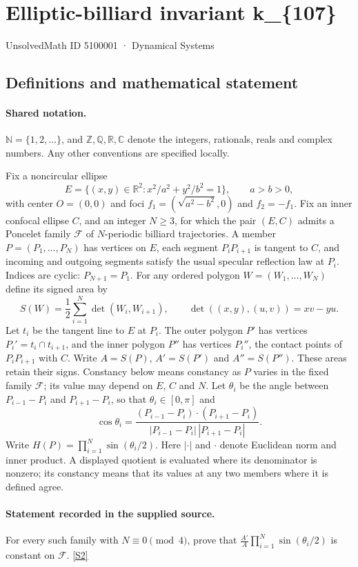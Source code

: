 \documentclass[11pt]{article}
\newcommand{\sref}[2]{\hyperlink{source:#1:#2}{[S#2]}}
\begin{document}
\setcounter{section}{5100000}
\section{Elliptic-billiard invariant k\_\{107\}}\label{5100001}
{\small\sffamily UnsolvedMath ID 5100001 · Dynamical Systems}
\subsection{Definitions and mathematical statement}

\paragraph{Shared notation.}$\mathbb N=\{1,2,\ldots\}$, and $\mathbb Z,\mathbb Q,\mathbb R,\mathbb C$ denote the integers, rationals, reals and complex numbers. Any other conventions are specified locally.


Fix a noncircular ellipse
\[
E=\{(x,y)\in\mathbb R^2:x^2/a^2+y^2/b^2=1\},\qquad a>b>0,
\]
with center $O=(0,0)$ and foci $f_1=(\sqrt{a^2-b^2},0)$ and $f_2=-f_1$. Fix an inner confocal ellipse $C$, and an integer $N\geq3$, for which the pair $(E,C)$ admits a Poncelet family $\mathcal F$ of $N$-periodic billiard trajectories. A member $P=(P_1,\ldots,P_N)$ has vertices on $E$, each segment $P_iP_{i+1}$ is tangent to $C$, and incoming and outgoing segments satisfy the usual specular reflection law at $P_i$. Indices are cyclic: $P_{N+1}=P_1$.
For any ordered polygon $W=(W_1,\ldots,W_N)$ define its signed area by
\[
S(W)=\frac12\sum_{i=1}^N\det(W_i,W_{i+1}),\qquad
\det((x,y),(u,v))=xv-yu.
\]
Let $t_i$ be the tangent line to $E$ at $P_i$. The outer polygon $P'$ has vertices $P_i'=t_i\cap t_{i+1}$, and the inner polygon $P''$ has vertices $P_i''$, the contact points of $P_iP_{i+1}$ with $C$. Write $A=S(P)$, $A'=S(P')$ and $A''=S(P'')$. These areas retain their signs. Constancy below means constancy as $P$ varies in the fixed family $\mathcal F$; its value may depend on $E$, $C$ and $N$.
Let $\theta_i$ be the angle between $P_{i-1}-P_i$ and $P_{i+1}-P_i$, so that $\theta_i\in[0,\pi]$ and
\[
\cos\theta_i=\frac{(P_{i-1}-P_i)\cdot(P_{i+1}-P_i)}{|P_{i-1}-P_i|\,|P_{i+1}-P_i|}.
\]
Write $H(P)=\prod_{i=1}^N\sin(\theta_i/2)$. Here $|\cdot|$ and $\cdot$ denote Euclidean norm and inner product.
A displayed quotient is evaluated where its denominator is nonzero; its constancy means that its values at any two members where it is defined agree.
\paragraph{Statement recorded in the supplied source.}
For every such family with $N\equiv0\pmod4$, prove that $\displaystyle \frac{A'}{A}\prod_{i=1}^N\sin(\theta_i/2)$ is constant on $\mathcal F$. \sref{5100001}{2}
\end{document}
